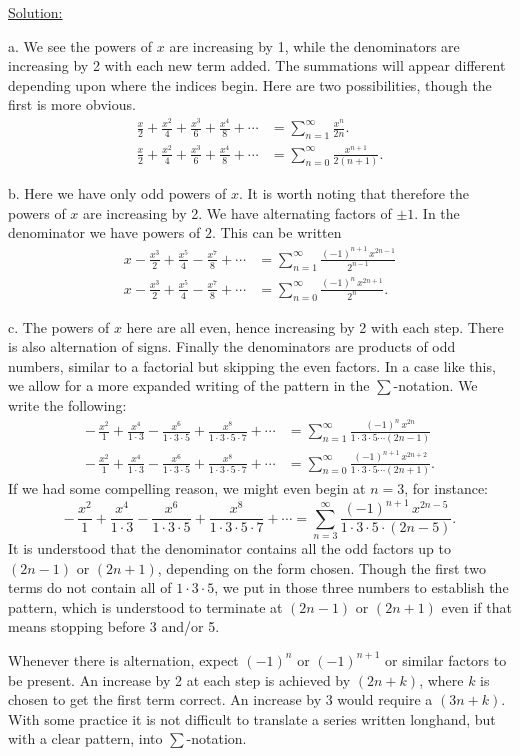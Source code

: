 \underline{Solution:} \begin{description}
\item a. We see the powers of $x$ are increasing by 1, while the
denominators are increasing by 2 with each new term added. 
The summations will appear different
depending upon where the indices begin.  Here are two 
possibilities, though the first is more obvious.
\begin{align*}
\frac{x}2+\frac{x^2}{4}+\frac{x^3}{6}+\frac{x^4}{8}+\cdots
&=\sum_{n=1}^\infty\frac{x^n}{2n}.\\
\frac{x}2+\frac{x^2}{4}+\frac{x^3}{6}+\frac{x^4}{8}+\cdots
&=\sum_{n=0}^\infty\frac{x^{n+1}}{2(n+1)}.\end{align*} 
\item b. Here we have only odd powers of $x$.  It is worth noting
that therefore the powers of $x$ are increasing by 2.
We have alternating factors of $\pm 1$.
In the denominator we have powers of $2$.  This
can be written 
\begin{align*}
x-\frac{x^3}{2}+\frac{x^5}{4}-\frac{x^7}{8}+\cdots
	&=\sum_{n=1}^\infty\frac{(-1)^{n+1}\,x^{2n-1}}{2^{n-1}}\\
x-\frac{x^3}{2}+\frac{x^5}{4}-\frac{x^7}{8}+\cdots
	&=\sum_{n=0}^\infty\frac{(-1)^n\,x^{2n+1}}{2^n}.
\end{align*} 
\item c. The powers of $x$ here are all even, hence increasing by
2 with each step.  There is also alternation of signs.  Finally
the denominators are products of odd numbers, similar to a 
factorial but skipping the even factors.  In a case like this,
we allow for a more expanded writing of the pattern in the
$\sum$-notation.  We write the following:
\begin{align*}
-\,\frac{x^2}{1}+\frac{x^4}{1\cdot3}-\frac{x^6}{1\cdot3\cdot5}
        +\frac{x^8}{1\cdot3\cdot5\cdot7}+\cdots
&=\sum_{n=1}^\infty\frac{(-1)^n\,x^{2n}}{1\cdot3\cdot5
\cdots(2n-1)}\\
-\,\frac{x^2}{1}+\frac{x^4}{1\cdot3}-\frac{x^6}{1\cdot3\cdot5}
        +\frac{x^8}{1\cdot3\cdot5\cdot7}+\cdots
&=\sum_{n=0}^\infty\frac{(-1)^{n+1}\,x^{2n+2}}{
	1\cdot3\cdot5\cdots(2n+1)}.\end{align*} 
If we had some compelling reason, we might even begin at $n=3$,
for instance:
$$-\,\frac{x^2}{1}+\frac{x^4}{1\cdot3}-\frac{x^6}{1\cdot3\cdot5}
        +\frac{x^8}{1\cdot3\cdot5\cdot7}+\cdots
=\sum_{n=3}^\infty\frac{(-1)^{n+1}\,x^{2n-5}}{1
\cdot3\cdot5\cdot(2n-5)}.$$
It is understood that the denominator contains all the odd
factors up to $(2n-1)$ or $(2n+1)$, depending on the form chosen.
Though the first two terms do not contain all of $1\cdot3\cdot5$,
we put in those three numbers to establish the pattern, which
is understood to terminate at $(2n-1)$ or $(2n+1)$ even if that
means stopping before 3 and/or 5.

Whenever there is alternation, expect $(-1)^n$ or $(-1)^{n+1}$
or similar factors to be present.  An increase by 2 at each step
is achieved by $(2n+k)$, where $k$ is chosen to get the first 
term correct.  An increase by 3 would require a $(3n+k)$.
With some practice it is not difficult to translate a series
written longhand, but with a clear pattern, into $\sum$-notation.
\end{description}
